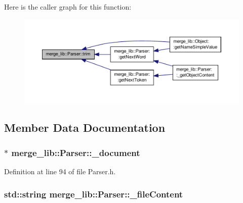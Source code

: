 Here is the caller graph for this function\-:
\nopagebreak
\begin{figure}[H]
\begin{center}
\leavevmode
\includegraphics[width=350pt]{d4/de3/classmerge__lib_1_1_parser_a89825c31c50fa949dab5b0b4974b7677_icgraph}
\end{center}
\end{figure}




\subsection{Member Data Documentation}
\hypertarget{classmerge__lib_1_1_parser_a960a35df87a3700cffd4dd2c64a76fa3}{
\subsubsection[{\-\_\-document}]{$\ast$ merge\-\_\-lib\-::\-Parser\-::\-\_\-document\hspace{0.3cm}{\ttfamily [protected]}}}\label{d4/de3/classmerge__lib_1_1_parser_a960a35df87a3700cffd4dd2c64a76fa3}


Definition at line 94 of file Parser.\-h.

\hypertarget{classmerge__lib_1_1_parser_ad4811a7d46bb4b2795b22b4bef2f10bb}{
\subsubsection[{\-\_\-file\-Content}]{\setlength{\rightskip}{0pt plus 5cm}std\-::string merge\-\_\-lib\-::\-Parser\-::\-\_\-file\-Content\hspace{0.3cm}{\ttfamily [protected]}}}\label{d4/de3/classmerge__lib_1_1_parser_ad4811a7d46bb4b2795b22b4bef2f10bb}


